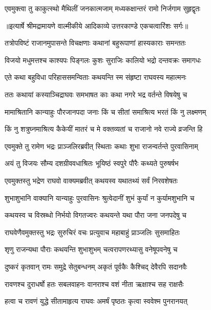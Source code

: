 \twolineshloka
{एवमुक्त्वा तु काकुत्स्थो मैथिलीं जनकात्मजाम्}
{मध्यकक्षान्तरं रामो निर्जगाम सुहृद्वृतः} %


{॥इत्यार्षे श्रीमद्रामायणे वाल्मीकीये आदिकाव्ये उत्तरकाण्डे एकचत्वारिंशः सर्गः॥}


\twolineshloka
{तत्रोपविष्टं राजानमुपासन्ते विचक्षणाः}
{कथानां बहुरूपाणां हास्यकाराः समन्ततः} %

\twolineshloka
{विजयो मधुमत्तश्च काश्यपः पिङ्गलः कुशः}
{सुराजिः कालियो भद्रो दन्तवक्रः समागधः} %

\twolineshloka
{एते कथा बहुविधा परिहाससमन्विताः}
{कथयन्ति स्म संहृष्टा राघवस्य महात्मनः} %

\twolineshloka
{ततः कथायां कस्याञ्चिद्राघवः समभाषत}
{काः कथा नगरे भद्र वर्तन्ते विषयेषु च} %

\twolineshloka
{मामाश्रितानि कान्याहुः पौरजानपदा जनाः}
{किं च सीतां समाश्रित्य भरतं किं नु लक्ष्मणम्} %

\twolineshloka
{किं नु शत्रुघ्नमाश्रित्य कैकेयीं मातरं च मे}
{वक्तव्यतां च राजानो नवे राज्ये व्रजन्ति हि} %

\twolineshloka
{एवमुक्ते तु रामेण भद्रः प्राञ्जलिरब्रवीत्}
{स्थिताः कथाः शुभा राजन्वर्तन्ते पुरवासिनाम्} %

\twolineshloka
{अयं तु विजयः सौम्य दशग्रीववधाश्रितः}
{भूयिष्ठं स्वपुरे पौरैः कथ्यते पुरुषर्षभ} %

\twolineshloka
{एवमुक्तस्तु भद्रेण राघवो वाक्यमब्रवीत्}
{कथयस्व यथातथ्यं सर्वं निरवशेषतः} %

\twolineshloka
{शुभाशुभानि वाक्यानि यान्याहुः पुरवासिनः}
{श्रुत्वेदानीं शुभं कुर्यां न कुर्यामशुभानि च} %

\twolineshloka
{कथयस्व च विस्रब्धो निर्भयो विगतज्वरः}
{कथयन्ते यथा पौरा जना जनपदेषु च} %

\twolineshloka
{राघवेणैवमुक्तस्तु भद्रः सुरुचिरं वचः}
{प्रत्युवाच महाबाहुं प्राञ्जलिः सुसमाहितः} %

\twolineshloka
{शृणु राजन्यथा पौराः कथयन्ति शुभाशुभम्}
{चत्वरापणरथ्यासु वनेषूपवनेषु च} %

\twolineshloka
{दुष्करं कृतवान् रामः समुद्रे सेतुबन्धनम्}
{अकृतं पूर्वकैः कैश्चिद् देवैरपि सदानवैः} %

\twolineshloka
{रावणश्च दुराधर्षो हतः सबलवाहनः}
{वानराश्च वशं नीता ऋक्षाश्च सह राक्षसैः} %

\twolineshloka
{हत्वा च रावणं युद्धे सीतामाहृत्य राघवः}
{अमर्षं पृष्ठतः कृत्वा स्ववेश्म पुनरानयत्} %

